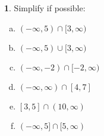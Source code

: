 \documentclass[12pt]{book}
\theoremstyle{definition}
\newtheorem{thm}{}
\begin{document}
\setcounter{thm}{4}
\begin{thm}
  Simplify if possible:
  \begin{enumerate}[(a)]
  \item
    $\displaystyle{(-\infty, 5) \cap [3,\infty)}$
  \item
    $\displaystyle{(-\infty, 5) \cup [3,\infty)}$
  \item
    $\displaystyle{(-\infty, -2) \cap [-2, \infty)}$
  \item
    $\displaystyle{(-\infty, \infty) \cap [4,7]}$
  \item
    $\displaystyle{[3,5] \cap (10, \infty)}$
  \item
    $\displaystyle{(-\infty, 5] \cap [5, \infty)}$
  \end{enumerate}
\end{thm}
\end{document}
